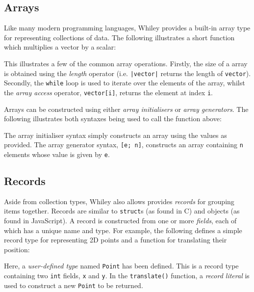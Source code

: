 \newpage
\subsection{Arrays}
\label{walkthrough_collections}
Like many modern programming languages, Whiley provides a built-in array type for representing collections of data.  The following illustrates a short function which multiplies a vector by a scalar:



This illustrates a few of the common array operations.  Firstly, the size of a array is obtained using the {\em length} operator (i.e. \lstinline{|vector|} returns the length of \lstinline{vector}).  Secondly, the \lstinline{while} loop is used to iterate over the elements of the array, whilst the {\em array access} operator, \lstinline{vector[i]}, returns the element at index \lstinline{i}.  

Arrays can be constructed using either {\em array initialisers} or {\em array generators}.  The following illustrates both syntaxes being used to call the function above:



The array initialiser syntax simply constructs an array using the values as provided.  The array generator syntax, \lstinline{[e; n]}, constructs an array containing \lstinline{n} elements whose value is given by \lstinline{e}.
\subsection{Records}
Aside from collection types, Whiley also allows provides {\em records} for grouping items together.  Records are similar to \lstinline{struct}s (as found in C) and objects (as found in JavaScript).  A record is constructed from one or more {\em fields}, each of which has a unique name and type.  For example, the following defines a simple record type for representing 2D points and a function for translating their position:



Here, a {\em user-defined type} named \lstinline{Point} has been defined.  This is a record type containing two \lstinline{int} fields, \lstinline{x} and \lstinline{y}.  In the \lstinline{translate()} function, a {\em record literal} is used to construct a new \lstinline{Point} to be returned.

